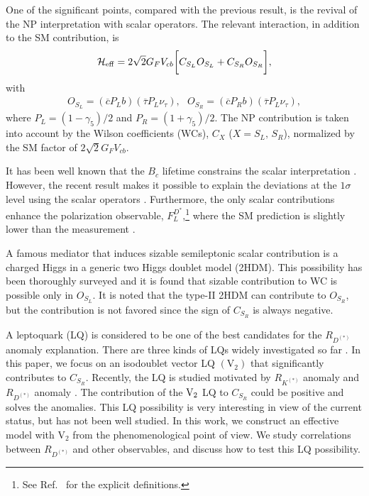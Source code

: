 \documentclass[12pt, a4paper]{article}
\numberwithin{equation}{section} %
\newcommand{\1}{\mbox{1}\hspace{-0.25em}\mbox{l}}
\begin{document}
One of the significant points, compared with the previous result, is the revival of the NP interpretation with scalar operators.
The relevant interaction, in addition to the SM contribution, is
\begin{align}
 {\cal {H}}_{\rm{eff}}= 2 \sqrt2 G_FV_{cb}\biggl[ C_{S_L}O_{S_L}+C_{S_
R}O_{S_R}\biggl],
\label{eq:Ham_bctaunu}
\end{align}
with
\begin{align}
 O_{S_L} = (\overline{c}  P_Lb)(\overline{\tau} P_L \nu_{\tau}),~~~
 O_{S_R} = (\overline{c}  P_Rb)(\overline{\tau} P_L \nu_{\tau}), \label{eq:operator_bctaunu} 
\end{align}
where $P_L=(1-\gamma_5)/2$ and $P_R=(1+\gamma_5)/2$. 
The NP contribution is taken into account by the Wilson coefficients (WCs), $C_X$ ($X=S_L, \, S_R$), normalized by the SM factor of $2 \sqrt2 G_FV_{cb}$. 

It has been well known that the $B_c$ lifetime constrains the scalar interpretation \cite{Beneke:1996xe,Alonso:2016oyd,Celis:2016azn,Akeroyd:2017mhr,Blanke:2018yud,Aebischer:2021ilm}. However, the recent result makes it possible to explain the deviations at the $1\sigma$ level using the scalar operators \cite{Fedele:2022iib}.
Furthermore, the only scalar contributions enhance the polarization observable, $F_L^{D^*}$,\footnote{See Ref.~\cite{Tanaka:2012nw} for the explicit definitions.} where the SM prediction is slightly lower than the measurement \cite{Belle:2019ewo}.

A famous mediator that induces sizable semileptonic scalar contribution is a charged Higgs in a generic two Higgs doublet model (2HDM).
This possibility has been thoroughly surveyed \cite{Crivellin:2012ye,Ko:2012sv,Crivellin:2013wna,Cline:2015lqp,Crivellin:2015hha,Lee:2017kbi,Iguro:2017ysu,Iguro:2018qzf,Martinez:2018ynq,Fraser:2018aqj,Athron:2021auq,Iguro:2022uzz,Blanke:2022pjy,Fedele:2022iib,Kumar:2022rcf,Iguro:2023jju,Das:2023gfz} and it is found that sizable contribution to WC is possible only in $O_{S_L}$.
It is noted that the type-II 2HDM can contribute to $O_{S_R}$, but the contribution is not favored since the sign of $C_{S_R}$ is always negative.

A leptoquark (LQ) is considered to be one of the best candidates for the $R_{D^{(*)}}$ anomaly explanation. There are three kinds of LQs widely investigated so far \cite{Angelescu:2018tyl}.
In this paper, we focus on an isodoublet vector LQ $(\text{V}_2)$ that significantly contributes to $C_{S_R}$. Recently,
the LQ is studied motivated by $R_{K^{(*)}}$ anomaly 
\cite{Kosnik:2012dj,Shaw:2018sbe,Cheung:2022zsb} and $R_{D^{(*)}}$ anomaly \cite{Sakaki:2013bfa,Cheung:2022zsb}.
The contribution of the $\rm{V}_2$ LQ to $C_{S_R}$ could be positive and solves the anomalies.
This LQ possibility is very interesting in view of the current status, but has not been well studied. In this work, we construct an effective model with $\text{V}_2$
from the phenomenological point of view.
We study correlations between
$R_{D^{(*)}}$ and other observables, and discuss how to test this LQ possibility. 
\end{document}
